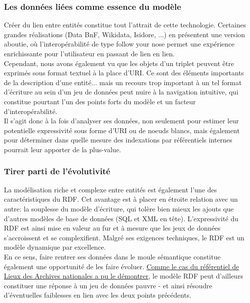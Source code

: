 \documentclass[a4paper,12pt,twoside]{book}
\begin{document}
\subsubsection{Les données liées comme essence du modèle}
Créer du lien entre entités constitue tout l'attrait de cette technologie. Certaines grandes réalisations (Data BnF, Wikidata, Isidore, ...) en présentent une version aboutie, où l'interopérabilité de type \og follow your nose \fg{} permet une expérience enrichissante pour l'utilisateur en passant de lien en lien.\\

Cependant, nous avons également vu que les objets d'un triplet peuvent être exprimés sous format textuel à la place d'URI. Ce sont des éléments importants de la description d'une entité... mais un recours trop important à un tel format d'écriture au sein d'un jeu de données peut nuire à la navigation intuitive, qui constitue pourtant l'un des points forts du modèle et un facteur d'interopérabilité.\\

Il s'agit donc à la fois d'analyser ses données, non seulement pour estimer leur potentielle expressivité sous forme d'URI ou de noeuds blancs, mais également pour déterminer dans quelle mesure des indexations par référentiels internes pourrait leur apporter de la plus-value.


\subsubsection{Tirer parti de l'évolutivité}
La modélisation riche et complexe entre entités est également l'une des caractéristiques du RDF. Cet avantage est à placer en étroite relation avec un autre: la souplesse du modèle d'écriture, qui tolère bien mieux les ajouts que d'autres modèles de base de données (SQL et XML en tête). L'expressivité du RDF est ainsi mise en valeur au fur et à mesure que les jeux de données s'accroissent et se complexifient. Malgré ses exigences techniques, le RDF est un modèle dynamique par excellence.\\

En ce sens, faire rentrer ses données dans le moule sémantique constitue également une opportunité de les faire évoluer. \hyperref[ref-lieux-AN]{Comme le cas du référentiel de Lieux des Archives nationales a pu le démontrer}, le modèle RDF peut d'ailleurs constituer une réponse à un jeu de données pauvre - et ainsi résoudre d'éventuelles faiblesses en lien avec les deux points précédents.\\
\end{document}
